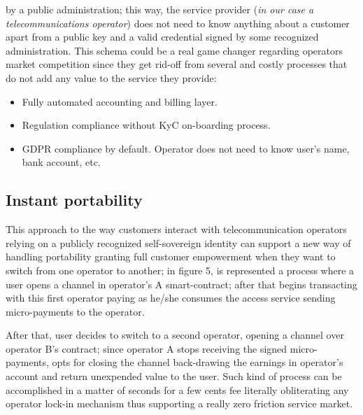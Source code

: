 \documentclass[12pt]{amsart}
\begin{document}
\begin{multicols}{2}
by a public administration; this way, the service provider (\textit{in
  our case a telecommunications operator}) does not need to know
anything about a customer apart from a public key and a valid
credential signed by some recognized administration. This schema could be a real game
changer regarding operators market competition since they get rid-off
from several and costly processes that do not add any value to the service
they provide:

\begin{itemize}
\item Fully automated accounting and billing layer.
\item Regulation compliance without KyC on-boarding process.
\item GDPR compliance by default. Operator does not need to know
  user's name, bank account, etc.
\end{itemize}

\subsection{Instant portability}

\vspace{0.35cm}

This approach to the way customers interact with telecommunication
operators relying on a publicly recognized self-sovereign identity
can support a new way of handling portability granting full customer
empowerment when they want to switch from one operator to another;
in figure 5, is represented a process where a user opens a channel
in operator's A smart-contract; after that begins transacting with
this first operator paying as he/she consumes the access service
sending micro-payments to the operator.

\vspace{0.35cm}

After that, user decides to switch to a second operator, opening a channel
over operator B's contract; since operator A stops receiving the signed
micro-payments, opts for closing the channel back-drawing the earnings in operator's
account and return unexpended value to the user. Such kind of process can be accomplished
in a matter of seconds for a few cents fee literally obliterating any
operator lock-in mechanism thus supporting a really zero friction service market.

\end{multicols}
\end{document}
